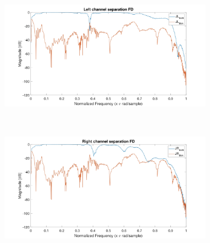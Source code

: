 \documentclass[12pt,a4paper,titlepage]{article}
\begin{document}
\begin{figure}[h]
\begin{subfigure}{1\textwidth}
	\includegraphics[width=.9\textwidth]{Immagini/left_channel_separation_FD}
	\caption{}
	\label{left_channel_separation_FD}
\end{subfigure}\\
\begin{subfigure}{1\textwidth}
	\includegraphics[width=.9\textwidth]{Immagini/right_channel_separation_FD}
	\caption{}
	\label{right_channel_separation_FD}
\end{subfigure}
\end{figure}
\end{document}
